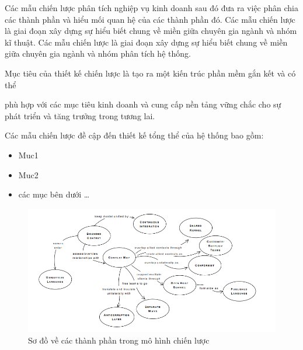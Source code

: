 Các mẫu chiến lược phân tích nghiệp vụ kinh doanh sau đó   đưa ra việc phân chia các thành phần và hiểu mối quan hệ của các thành phần đó.
Các mẫu chiến lược là giai đoạn xây dựng     sự hiểu biết chung về miền giữa chuyên gia ngành và nhóm kĩ thuật.
Các mẫu chiến lược là giai đoạn xây dựng     sự hiểu biết chung về miền giữa chuyên gia ngành và nhóm phân tích hệ thống.


%






%

Mục tiêu của thiết kế chiến lược là tạo ra một kiến trúc phần mềm gắn kết và có thể


phù hợp với các mục tiêu kinh doanh và cung cấp nền tảng vững chắc cho sự phát triển và tăng trưởng trong tương lai.

%

Các mẫu chiến lược đề cập đến thiết kế tổng thể của hệ thống bao gồm:

\begin{itemize}

\item Muc1

\item Muc2

\item các mục bên dưới \dots

\end{itemize}

%

\begin{figure}[H]

\centering

\includegraphics[width = 1\textwidth]{pictures/CacMoHinhChienLuoc/temp.png}

\caption{Sơ đồ về các thành phần trong mô hình chiến lược}

\end{figure}

